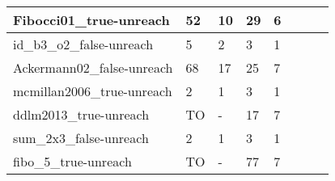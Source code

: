 \begin{table}
{\begin{tabular}{|l|l|l|l|l|l|l|}
    Fibocci01\_true-unreach                                  & 52                                    & 10                                         & 29                                    & 6                                          & ~                                                               & ~                                        \\ \hline
    id\_b3\_o2\_false-unreach                                & 5                                     & 2                                          & 3                                     & 1                                          & ~                                                               & ~                                        \\ \hline
    Ackermann02\_false-unreach                               & 68                                    & 17                                         & 25                                    & 7                                          & ~                                                               & ~                                        \\ \hline
    mcmillan2006\_true-unreach                               & 2                                     & 1                                          & 3                                     & 1                                          & ~                                                               & ~                                        \\ \hline
    ddlm2013\_true-unreach                                   & TO                                    & -                                          & 17                                    & 7                                          & ~                                                               & ~                                        \\ \hline
    sum\_2x3\_false-unreach                                  & 2                                     & 1                                          & 3                                     & 1                                          & ~                                                               & ~                                        \\ \hline
    fibo\_5\_true-unreach                                    & TO                                    & -                                          & 77                                    & 7                                          & ~                                                               & ~                                        \\ \hline

\end{tabular}}
\end{table}
